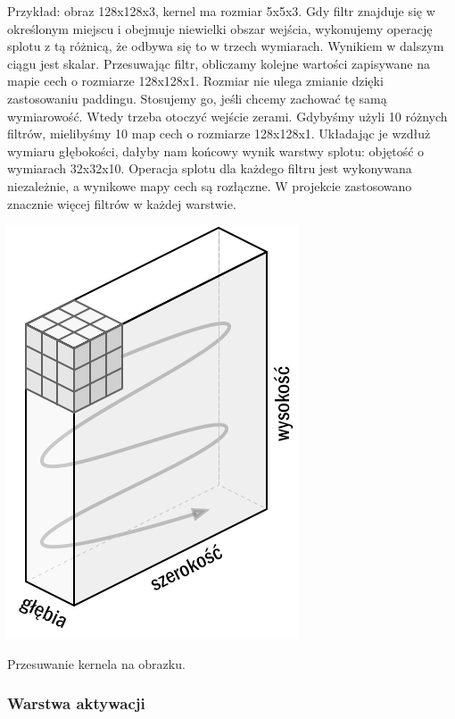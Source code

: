 \documentclass[12pt,a4paper]{article}
\begin{document}
        Przykład: obraz 128x128x3, kernel ma rozmiar 5x5x3. Gdy filtr znajduje się w określonym miejscu i obejmuje niewielki obszar wejścia, wykonujemy operację splotu z tą różnicą, że odbywa się to w trzech wymiarach. Wynikiem w dalszym ciągu jest skalar. Przesuwając filtr, obliczamy kolejne wartości zapisywane na mapie cech o rozmiarze 128x128x1. Rozmiar nie ulega zmianie dzięki zastosowaniu paddingu. Stosujemy go, jeśli chcemy zachować tę samą wymiarowość. Wtedy trzeba otoczyć wejście zerami. Gdybyśmy użyli 10 różnych filtrów, mielibyśmy 10 map cech o rozmiarze 128x128x1. Układając je wzdłuż wymiaru głębokości, dałyby nam końcowy wynik warstwy splotu: objętość o wymiarach 32x32x10. Operacja splotu dla każdego filtru jest wykonywana niezależnie, a wynikowe mapy cech są rozłączne. W projekcie zastosowano znacznie więcej filtrów w każdej warstwie.
        \begin{center}
            \includegraphics[scale=0.35]{kernel-movement.png}
            \begin{flushright}
                \begin{scriptsize}
                Przesuwanie kernela na obrazku.
                \end{scriptsize}
            \end{flushright}
        \end{center}
    \subsubsection{Warstwa aktywacji}
    
\end{document}
